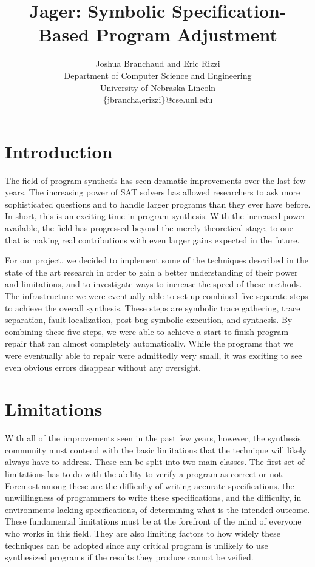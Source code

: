 \documentclass[]{article}
\author{Joshua Branchaud and Eric Rizzi \\
Department of Computer Science and Engineering \\
University of Nebraska-Lincoln \\
\{jbrancha,erizzi\}@cse.unl.edu}
\date{}
\begin{document}
\title{Jager: Symbolic Specification-Based Program Adjustment}

\maketitle

\section{Introduction}
The field of program synthesis has seen dramatic improvements over the last
few years.  The increasing power of SAT solvers has allowed researchers to
ask more sophisticated questions and to handle larger programs than they
ever have before.  In short, this is an exciting time in program synthesis.
With the increased power available, the field has progressed beyond the
merely theoretical stage, to one that is making real contributions with even
larger gains expected in the future.

For our project, we decided to implement some of the techniques described in
the state of the art research in order to gain a better understanding of
their power and limitations, and to investigate ways to increase the speed
of these methods.  The infrastructure we were eventually able to set up
combined five separate steps to achieve the overall synthesis.  These steps
are symbolic trace gathering, trace separation, fault localization, post bug
symbolic execution, and synthesis.  By combining these five steps, we were
able to achieve a start to finish program repair that ran almost completely
automatically.  While the programs that we were eventually able to repair
were admittedly very small, it was exciting to see even obvious errors
disappear without any oversight.


\section{Limitations}
With all of the improvements seen in the past few years, however, the
synthesis community must contend with the basic limitations that the
technique will likely always have to address.  These can be split into two
main classes.  The first set of limitations has to do with the ability to
verify a program as correct or not.  Foremost among these are the difficulty
of writing accurate specifications, the unwillingness of programmers to
write these specifications, and the difficulty, in environments lacking
specifications, of determining what is the intended outcome.  These
fundamental limitations must be at the forefront of the mind of everyone who
works in this field.  They are also limiting factors to how widely these
techniques can be adopted since any critical program is unlikely to use
synthesized programs if the results they produce cannot be veified.
\end{document}
